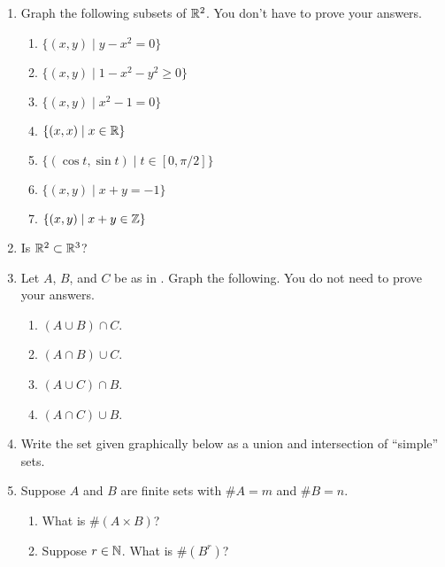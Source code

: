 \begin{enumerate}
    \item Graph the following subsets of $\mathbb{R}^2$. You don't have to prove your answers.
  \begin{enumerate}
      \item $\{(x, y) \mid y - x^2 = 0\}$
      \item $\{(x, y) \mid 1 - x^2 - y^2 \geq 0\}$
      \item $\{(x, y) \mid x^2 - 1 = 0\}$
      \item $\{(x, x) \mid x \in \mathbb{R}\}$
      \item $\{(\cos t, \sin t) \mid t \in [0, \pi/2]\}$
      \item $\{(x, y) \mid x + y = -1\}$
      \item $\{(x, y) \mid x + y \in \mathbb{Z}\}$
  \end{enumerate}

    \item Is $\mathbb{R}^2 \subset \mathbb{R}^3$?

    \item Let $A$, $B$, and $C$ be as in . Graph the following. You do not need to prove your answers.
  \begin{enumerate}
      \item $(A \cup B) \cap C$.
      \item $(A \cap B) \cup C$.
      \item $(A \cup C) \cap B$.
      \item $(A \cap C) \cup B$.
  \end{enumerate}

    \item Write the set given graphically below as a union and intersection of ``simple'' sets.
    \begin{center}
  \end{center}


    \item Suppose $A$ and $B$ are finite sets with $\# A = m$ and $\# B = n$.
  \begin{enumerate}
      \item What is $\# (A \times B)$?
      \item Suppose $r \in \mathbb{N}$. What is $\# (B^r)$?
  \end{enumerate}


\end{enumerate}
